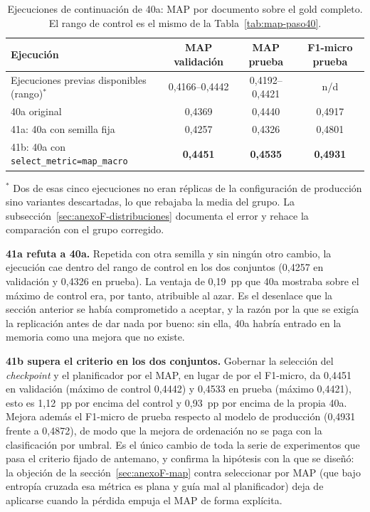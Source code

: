 \begin{table}[h]
\centering
\caption{Ejecuciones de continuación de 40a: MAP por documento sobre el gold completo. El rango de control es el mismo de la Tabla~\ref{tab:map-paso40}.}
\label{tab:map-paso41}
\begin{tabular}{lccc}
\hline
\textbf{Ejecución} & \textbf{MAP validación} & \textbf{MAP prueba} & \textbf{F1-micro prueba} \\
\hline
Ejecuciones previas disponibles (rango)$^{*}$ & 0{,}4166--0{,}4442 & 0{,}4192--0{,}4421 & n/d \\
40a original & 0{,}4369 & 0{,}4440 & 0{,}4917 \\
\hline
41a: 40a con semilla fija & 0{,}4257 & 0{,}4326 & 0{,}4801 \\
41b: 40a con \texttt{select\_metric=map\_macro} & \textbf{0{,}4451} & \textbf{0{,}4535} & \textbf{0{,}4931} \\
\hline
\end{tabular}

\vspace{2mm}
{\footnotesize $^{*}$ Dos de esas cinco ejecuciones no eran réplicas de la configuración de producción sino variantes descartadas, lo que rebajaba la media del grupo. La subsección~\ref{sec:anexoF-distribuciones} documenta el error y rehace la comparación con el grupo corregido.}
\end{table}

\textbf{41a refuta a 40a.} Repetida con otra semilla y sin ningún otro cambio, la ejecución cae dentro del rango de control en los dos conjuntos (0,4257 en validación y 0,4326 en prueba). La ventaja de 0,19~pp que 40a mostraba sobre el máximo de control era, por tanto, atribuible al azar. Es el desenlace que la sección anterior se había comprometido a aceptar, y la razón por la que se exigía la replicación antes de dar nada por bueno: sin ella, 40a habría entrado en la memoria como una mejora que no existe.

\textbf{41b supera el criterio en los dos conjuntos.} Gobernar la selección del \emph{checkpoint} y el planificador por el MAP, en lugar de por el F1-micro, da 0,4451 en validación (máximo de control 0,4442) y 0,4533 en prueba (máximo 0,4421), esto es 1,12~pp por encima del control y 0,93~pp por encima de la propia 40a. Mejora además el F1-micro de prueba respecto al modelo de producción (0,4931 frente a 0,4872), de modo que la mejora de ordenación no se paga con la clasificación por umbral. Es el único cambio de toda la serie de experimentos que pasa el criterio fijado de antemano, y confirma la hipótesis con la que se diseñó: la objeción de la sección~\ref{sec:anexoF-map} contra seleccionar por MAP (que bajo entropía cruzada esa métrica es plana y guía mal al planificador) deja de aplicarse cuando la pérdida empuja el MAP de forma explícita.

